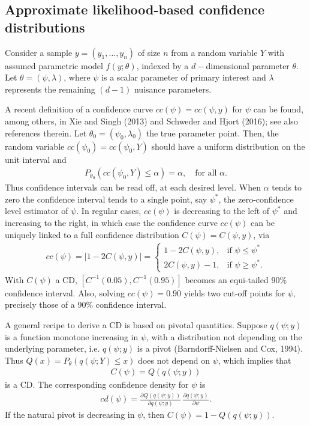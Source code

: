 \documentclass[preprint,12pt,authoryear]{elsarticle}
\begin{document}
\subsection{Approximate likelihood-based confidence distributions}

Consider a sample $y=(y_1,\ldots,y_n)$ of size $n$ from  a random variable $Y$ with assumed parametric model $f(y;\theta)$, indexed by a
 $d-$dimensional parameter $\theta$. Let $\theta=(\psi,\lambda)$, where $\psi$ is a scalar parameter of primary interest and $\lambda$ represents the remaining $(d-1)$  nuisance parameters.  
 
A recent definition of a confidence curve $cc(\psi)=cc(\psi,y)$ for $\psi$ can be found, among others, in Xie and Singh (2013) and Schweder and Hjort (2016); see also references therein. Let $\theta_0=(\psi_0,\lambda_0)$ the true parameter point. Then, the random variable $cc(\psi_0)=cc(\psi_0,Y)$ should have a uniform distribution on the unit interval and
\begin{eqnarray*}
P_{\theta_0} (cc(\psi_0,Y) \leq \alpha ) = \alpha, \quad  \text{for all} \, \, \alpha.
\end{eqnarray*}
Thus confidence intervals can be read off, at each desired level. When $\alpha$ tends to zero the confidence interval tends to a single point, say $\psi^*$, the zero-confidence level estimator of $\psi$. In regular cases, $cc(\psi)$ is decreasing to the left of $\psi^*$ and increasing to the right, in which case the confidence curve $cc(\psi)$ can be uniquely linked to a full confidence distribution $C(\psi)=C(\psi, y)$, via
\begin{eqnarray*}
cc(\psi) = |1-2C(\psi,y)| = \left\{ \begin{array}{ll}
1-2C(\psi,y), & \text{if}  \, \, \psi \leq \psi^* \\
2C(\psi,y)-1, & \text{if}  \, \, \psi \geq \psi^*.
\end{array} \right.
\end{eqnarray*}
With $C (\psi)$ a CD, $[C^{-1} (0.05), C^{-1} (0.95)]$ becomes an equi-tailed 90\% confidence interval. Also, solving $cc(\psi) = 0.90$ yields two cut-off points for $\psi$, precisely those of a 90\% confidence interval.  

A general recipe to derive a CD is based on pivotal quantities. Suppose $q(\psi;y)$ is a function monotone increasing in $\psi$, with a distribution not depending on the underlying parameter, i.e.  $q(\psi;y)$ is a pivot (Barndorff-Nielsen and Cox, 1994). Thus $Q(x) = P_\theta (q(\psi ;Y ) \leq x)$ does not depend on $\psi$, which implies that
\begin{eqnarray}
C(\psi) = Q(q(\psi;y))
\label{disq}
\end{eqnarray}
is a CD.  The corresponding confidence density for $\psi$ is
\begin{eqnarray*}
cd(\psi) =  \frac{\partial Q(q(\psi;y))}{\partial q(\psi;y)} \, \frac{\partial q(\psi;y)}{\partial \psi}.
\end{eqnarray*}
If the natural
pivot is decreasing in $\psi$, then $C(\psi) =1-Q(q(\psi;y))$. 
\end{document}
